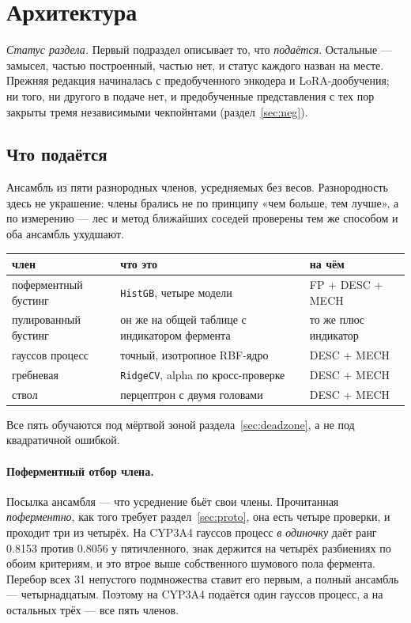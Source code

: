 \section{Архитектура}
\label{sec:arch}

\emph{Статус раздела.} Первый подраздел описывает то, что \emph{подаётся}. Остальные --- замысел,
частью построенный, частью нет, и статус каждого назван на месте. Прежняя редакция начиналась с
предобученного энкодера и LoRA-дообучения; ни того, ни другого в подаче нет, и предобученные
представления с тех пор закрыты тремя независимыми чекпойнтами (раздел~\ref{sec:neg}).

\subsection{Что подаётся}
\label{sec:submitarch}

Ансамбль из пяти разнородных членов, усредняемых без весов. Разнородность здесь не украшение: члены
брались не по принципу «чем больше, тем лучше», а по измерению --- лес и метод ближайших соседей
проверены тем же способом и оба ансамбль ухудшают.

\begin{center}
\begin{tabular}{lll}
\toprule
член & что это & на чём \\
\midrule
поферментный бустинг & \texttt{HistGB}, четыре модели & FP + DESC + MECH \\
пулированный бустинг & он же на общей таблице с индикатором фермента & то же плюс индикатор \\
гауссов процесс      & точный, изотропное RBF-ядро & DESC + MECH \\
гребневая            & \texttt{RidgeCV}, alpha по кросс-проверке & DESC + MECH \\
ствол                & перцептрон с двумя головами & DESC + MECH \\
\bottomrule
\end{tabular}
\end{center}

Все пять обучаются под мёртвой зоной раздела~\ref{sec:deadzone}, а не под квадратичной ошибкой.

\paragraph{Поферментный отбор члена.} Посылка ансамбля --- что усреднение бьёт свои члены. Прочитанная
\emph{поферментно}, как того требует раздел~\ref{sec:proto}, она есть четыре проверки, и проходит три
из четырёх. На CYP3A4 гауссов процесс \emph{в одиночку} даёт ранг 0.8153 против 0.8056 у пятичленного,
знак держится на четырёх разбиениях по обоим критериям, и это втрое выше собственного шумового пола
фермента. Перебор всех 31 непустого подмножества ставит его первым, а полный ансамбль --- четырнадцатым.
Поэтому на CYP3A4 подаётся один гауссов процесс, а на остальных трёх --- все пять членов.

